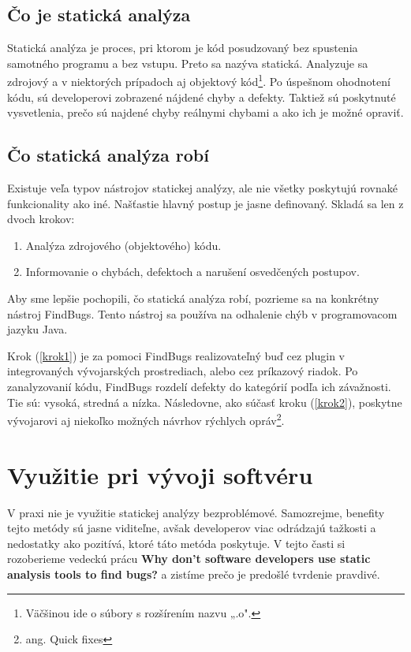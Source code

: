 \documentclass[10pt,twoside,slovak,a4paper]{article}
\begin{document}
\subsection{Čo je statická analýza} \label{principy:co}
Statická analýza je proces, pri ktorom je kód posudzovaný bez spustenia samotného programu a bez vstupu. Preto sa
nazýva statická. Analyzuje sa zdrojový a v niektorých prípadoch aj objektový kód\footnote{Väčšinou ide o súbory s
	rozšírením nazvu „.o".}. Po úspešnom ohodnotení kódu, sú developerovi zobrazené nájdené chyby a defekty. Taktiež sú
poskytnuté vysvetlenia, prečo sú najdené chyby reálnymi chybami a ako ich je možné opraviť.\cite{wiki:Static_program_analysis}

\subsection{Čo statická analýza robí} \label{principy:ako}
Existuje veľa typov nástrojov statickej analýzy, ale nie všetky poskytujú rovnaké funkcionality ako iné. Našťastie
hlavný postup je jasne definovaný. Skladá sa len z dvoch krokov:

\begin{enumerate}
	\item Analýza zdrojového (objektového) kódu. \label{krok1}
	\item Informovanie o chybách, defektoch a narušení osvedčených postupov. \label{krok2}
\end{enumerate}

Aby sme lepšie pochopili, čo statická analýza robí, pozrieme sa na konkrétny nástroj FindBugs. Tento
nástroj sa používa na odhalenie chýb v programovacom jazyku Java.\cite{FindBugs}

Krok (\ref{krok1}) je za pomoci FindBugs realizovateľný buď cez plugin v integrovaných vývojarských prostrediach, alebo
cez príkazový riadok. Po zanalyzovanií kódu, FindBugs rozdelí defekty do kategórií podľa ich závažnosti. Tie sú:
vysoká, stredná a nízka. Následovne, ako súčasť kroku (\ref{krok2}), poskytne vývojarovi aj niekoľko možných návrhov
rýchlych opráv\footnote{ang. Quick fixes}.\cite{BrittanyJohnson,NathanAyewah}


\section{Využitie pri vývoji softvéru} \label{vyuzitie}
V praxi nie je využitie statickej analýzy bezproblémové. Samozrejme, benefity tejto metódy sú jasne viditeľne, avšak
developerov viac odrádzajú tažkosti a nedostatky ako pozitívá, ktoré táto metóda poskytuje. V tejto časti si
rozoberieme vedeckú prácu \textbf{Why don't software developers use static analysis tools to find bugs?}\cite{BrittanyJohnson}
a zistíme prečo je predošlé tvrdenie pravdivé.
\end{document}

